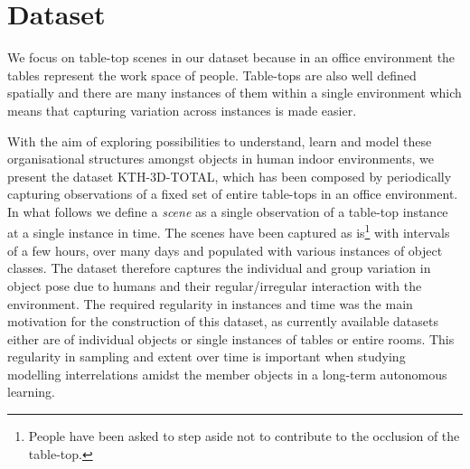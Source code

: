 \documentclass[letterpaper, 10 pt, conference]{ieeeconf}  %
\begin{document}
\section{Dataset}
\label{sec:Dataset}
We focus on table-top scenes in our dataset because in an office environment the tables represent the work space of people. Table-tops are also well defined spatially and there are many instances of them within a single environment which means that capturing variation across instances is made easier.

With the aim of exploring possibilities to understand, learn and model these organisational structures amongst objects in human indoor 
environments, we present the dataset KTH-3D-TOTAL, which has been composed by periodically capturing observations of a fixed set of entire 
table-tops in an office environment. In what follows we define a \textit{scene} as a single observation of a table-top instance at a single 
instance in time. The scenes have been captured as is\footnote{People have been asked to step aside not to contribute to the occlusion of 
the table-top.} with intervals of a few hours, over many days and populated with various instances of object classes. The dataset therefore 
captures the individual and group variation in object pose due to humans and their regular/irregular interaction with the environment. The 
required regularity in instances and time was the main motivation for the construction of this dataset, as currently available datasets 
either are of individual objects or single instances of tables or entire rooms. This regularity in sampling and extent over time is 
important when studying modelling interrelations amidst the member objects in a long-term autonomous learning. 
\end{document}
